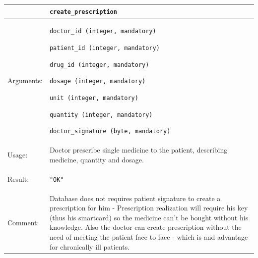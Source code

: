 
    \begin{longtable}{| p{3cm} | p{10.75cm} |}
    \hline
     & \texttt{create\_prescription} \\ \hline
    Arguments: &  \begin{packed_enum}
    	\item \texttt{doctor\_id (integer, mandatory)}
		\item \texttt{patient\_id (integer, mandatory)}
		\item \texttt{drug\_id (integer, mandatory)}
		\item \texttt{dosage (integer, mandatory)}
		\item \texttt{unit (integer, mandatory)}
		\item \texttt{quantity (integer, mandatory)}
		\item \texttt{doctor\_signature (byte, mandatory)}
	\end{packed_enum}     \\ \hline
    Usage: & Doctor prescribe single medicine to the patient, describing medicine, quantity and dosage. \\ \hline
    Result: & \begin{packed_enum}
    	\item \texttt{"OK"}
	\end{packed_enum}     \\ \hline	
		Comment: & Database does not requires patient signature to create a prescription for him - Prescription realization will require his key (thus his smartcard) so the medicine can't be bought without his knowledge. Also the doctor can create prescription without the need of meeting the patient face to face - which is and advantage for chronically ill patients.\\ \hline
    \end{longtable}



